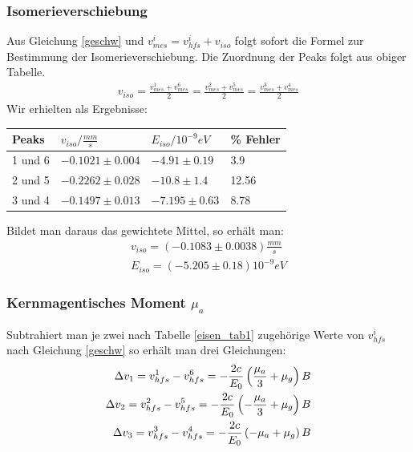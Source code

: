 \documentclass[12pt]{article}
\begin{document}
\subsubsection{Isomerieverschiebung}
Aus Gleichung \ref{geschw} und $v_{mes}^i = v_{hfs}^i + v_{iso}$ folgt sofort die Formel zur Bestimmung der Isomerieverschiebung. Die Zuordnung 
der Peaks folgt aus obiger Tabelle.
\begin{align*}
 v_{iso} = \frac{v_{mes}^1+v_{mes}^6}{2} =\frac{v_{mes}^2+v_{mes}^5}{2} =\frac{v_{mes}^3+v_{mes}^4}{2}
\end{align*}
Wir erhielten als Ergebnisse: \\
\newline
\begin{center}
\begin{tabular}{|l|lll|}
\hline
Peaks & $v_{iso}/\frac{mm}{s}$ & $E_{iso}/10^{-9}eV$ & \% Fehler\\
\hline
1 und 6& $-0.1021 \pm 0.004$ & $-4.91 \pm 0.19$ & 3.9\\
2 und 5& $-0.2262 \pm 0.028$ & $-10.8 \pm 1.4$ & 12.56\\
3 und 4& $-0.1497 \pm 0.013$ & $-7.195 \pm 0.63$ & 8.78\\
\hline
\end{tabular}
\label{eisen_tabiso}
\end{center}

Bildet man daraus das gewichtete Mittel, so erhält man:
\begin{align*}
 v_{iso} = (-0.1083\pm 0.0038)\frac{mm}{s} \\
 E_{iso} = (-5.205 \pm 0.18)10^{-9} eV
\end{align*}

\subsubsection[Kernmagentisches Moment]{Kernmagentisches Moment $\mu_a$}
Subtrahiert man je zwei nach Tabelle \ref{eisen_tab1} zugehörige Werte von $v_{hfs}^i$ nach Gleichung \ref{geschw} so erhält man drei Gleichungen:
\begin{align}
 \notag \Delta v_1=v_{hfs}^1 - v_{hfs}^6 = -\frac{2c}{E_0} \left( \frac{\mu_a}{3} + \mu_g \right) B \\
 \Delta v_2=v_{hfs}^2 - v_{hfs}^5 = -\frac{2c}{E_0} \left( -\frac{\mu_a}{3} + \mu_g \right) B \\
 \notag \Delta v_3=v_{hfs}^3 - v_{hfs}^4 = -\frac{2c}{E_0} \left( -\mu_a + \mu_g \right) B 
\end{align}
\label{diff_geschw}
\end{document}
